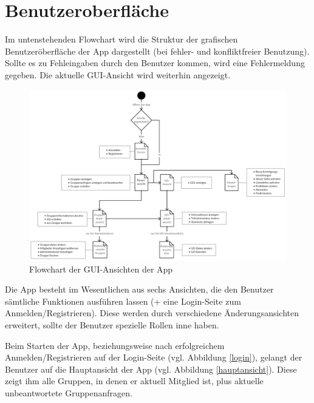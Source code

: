 \documentclass[parskip=full]{scrartcl}
\begin{document}
\newpage
\section{Benutzeroberfläche}

Im untenstehenden Flowchart wird die Struktur der grafischen Benutzeröberfläche der App dargestellt (bei fehler- und konfliktfreier Benutzung). Sollte es zu Fehleingaben durch den Benutzer kommen, wird eine Fehlermeldung gegeben. Die aktuelle GUI-Ansicht wird weiterhin angezeigt.

\begin{figure}[H]
	\vspace{1cm}
	\centering
	\includegraphics[width=\textwidth]{res/gui_flowchart.png}
	\caption{Flowchart der GUI-Ansichten der App}
	\vspace{1cm}
	\end{figure}

Die App besteht im Wesentlichen aus sechs Ansichten, die den Benutzer sämtliche Funktionen ausführen lassen (+ eine Login-Seite zum Anmelden/Registrieren). Diese werden durch verschiedene Änderungsansichten erweitert, sollte der Benutzer spezielle Rollen inne haben.

\newpage

Beim Starten der App, beziehungsweise nach erfolgreichem Anmelden/Registrieren auf der Login-Seite (vgl. Abbildung \ref{login}), gelangt der Benutzer auf die Hauptansicht der App (vgl. Abbildung \ref{hauptansicht}). Diese zeigt ihm alle Gruppen, in denen er aktuell Mitglied ist, plus aktuelle unbeantwortete Gruppenanfragen.
\end{document}
